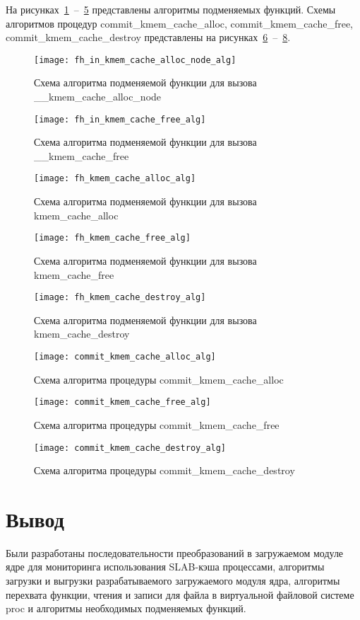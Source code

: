 На рисунках~\ref{fh_in_kmem_cache_alloc_node_alg}~--~\ref{fh_kmem_cache_destroy_alg} представлены алгоритмы подменяемых функций. Схемы алгоритмов процедур commit\_kmem\_cache\_alloc, commit\_kmem\_cache\_free, commit\_kmem\_cache\_destroy представлены на рисунках~\ref{commit_kmem_cache_alloc_alg}~--~\ref{commit_kmem_cache_destroy_alg}.
\begin{figure}[H]
	\centering
	\texttt{[image: fh\_in\_kmem\_cache\_alloc\_node\_alg]}
	\caption{Схема алгоритма подменяемой функции для вызова \_\_kmem\_cache\_alloc\_node}
	\label{fh_in_kmem_cache_alloc_node_alg}
\end{figure}
\begin{figure}[H]
	\centering
	\texttt{[image: fh\_in\_kmem\_cache\_free\_alg]}
	\caption{Схема алгоритма подменяемой функции для вызова \_\_kmem\_cache\_free}
	\label{fh_in_kmem_cache_free_alg}
\end{figure}
\begin{figure}[H]
	\centering
	\texttt{[image: fh\_kmem\_cache\_alloc\_alg]}
	\caption{Схема алгоритма подменяемой функции для вызова kmem\_cache\_alloc}
	\label{fh_kmem_cache_alloc_alg}
\end{figure}
\begin{figure}[H]
	\centering
	\texttt{[image: fh\_kmem\_cache\_free\_alg]}
	\caption{Схема алгоритма подменяемой функции для вызова kmem\_cache\_free}
	\label{fh_kmem_cache_free_alg}
\end{figure}
\begin{figure}[H]
	\centering
	\texttt{[image: fh\_kmem\_cache\_destroy\_alg]}
	\caption{Схема алгоритма подменяемой функции для вызова kmem\_cache\_destroy}
	\label{fh_kmem_cache_destroy_alg}
\end{figure}
\begin{figure}[H]
	\centering
	\texttt{[image: commit\_kmem\_cache\_alloc\_alg]}
	\caption{Схема алгоритма процедуры commit\_kmem\_cache\_alloc}
	\label{commit_kmem_cache_alloc_alg}
\end{figure}
\begin{figure}[H]
	\centering
	\texttt{[image: commit\_kmem\_cache\_free\_alg]}
	\caption{Схема алгоритма процедуры commit\_kmem\_cache\_free}
	\label{commit_kmem_cache_free_alg}
\end{figure}
\begin{figure}[H]
	\centering
	\texttt{[image: commit\_kmem\_cache\_destroy\_alg]}
	\caption{Схема алгоритма процедуры commit\_kmem\_cache\_destroy}
	\label{commit_kmem_cache_destroy_alg}
\end{figure}

\section*{Вывод}

Были разработаны последовательности преобразований в загружаемом модуле ядре для мониторинга использования SLAB-кэша процессами, алгоритмы загрузки и выгрузки разрабатываемого загружаемого модуля ядра, алгоритмы перехвата функции, чтения и записи для файла в виртуальной файловой системе proc и алгоритмы необходимых подменяемых функций.
